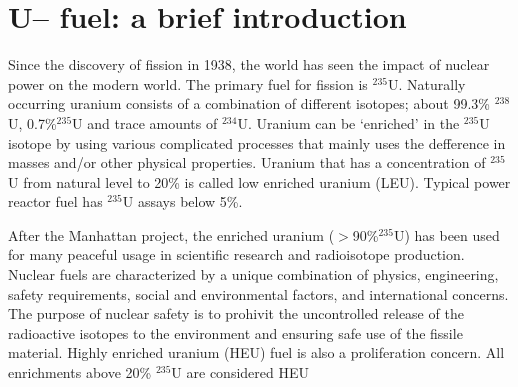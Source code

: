 \chapter{U--\protect{} fuel: a brief introduction}

Since the discovery of fission in 1938, the world has seen the impact of nuclear power on the modern world. The primary fuel for fission is $^{235}$U. Naturally occurring uranium consists of a combination of different isotopes; about 99.3\% $^{238}$U,  0.7\%$^{235}$U and trace amounts of $^{234}$U. Uranium can be `enriched' in the $^{235}$U isotope by using various complicated processes that mainly uses the defference in masses and/or other physical properties. Uranium that has a concentration of $^{235}$U from natural level to 20\% is called low enriched uranium (LEU). Typical power reactor fuel has $^{235}$U assays below 5\%.

After the Manhattan project, the enriched uranium ($>$90\%$^{235}$U) has been used for many peaceful usage in scientific research and radioisotope production. Nuclear fuels are characterized by a unique combination of physics, engineering, safety requirements, social and environmental factors, and international concerns. The purpose of nuclear safety is to prohivit the uncontrolled release of the radioactive isotopes to the environment and ensuring safe use of the fissile material. Highly enriched uranium (HEU) fuel is also a proliferation concern. All enrichments above 20\% $^{235}$U are considered HEU~\cite{international2005iaea}

